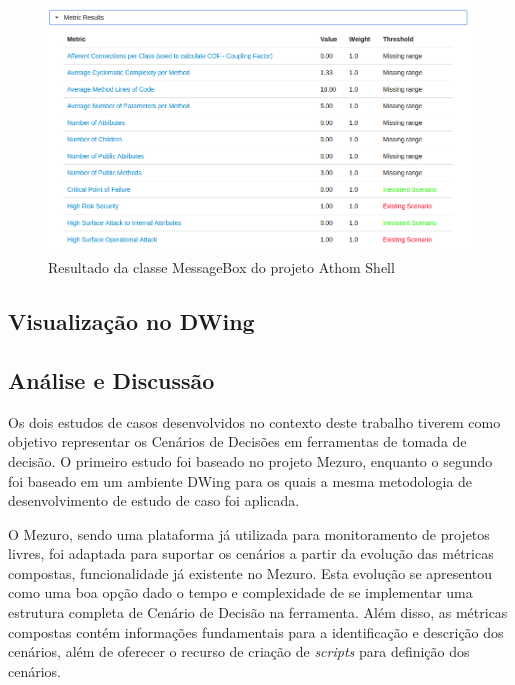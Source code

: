 \begin{figure}[H]
	\centering
	\includegraphics[scale=0.5]{figuras/message_box_class}
	\caption{Resultado da classe MessageBox do projeto Athom Shell}
	\label{message_box_class}
\end{figure}









\subsection{Visualização no DWing}
\label{vision-dw}

\subsection{Análise e Discussão}
\label{ana-disc}

Os dois estudos de casos desenvolvidos no contexto deste trabalho tiverem como objetivo representar os Cenários de Decisões em ferramentas de tomada de decisão. O primeiro estudo foi baseado no projeto Mezuro, enquanto o segundo foi baseado em um ambiente DWing para os quais a mesma metodologia de desenvolvimento de estudo de caso foi aplicada. 

O Mezuro, sendo uma plataforma já utilizada para monitoramento de projetos livres, foi adaptada para suportar os cenários a partir da evolução das métricas compostas, funcionalidade já existente no Mezuro. Esta evolução se apresentou como uma boa opção dado o tempo e complexidade de se implementar uma estrutura completa de Cenário de Decisão na ferramenta. Além disso, as métricas compostas contém informações fundamentais para a identificação e descrição dos cenários, além de oferecer o recurso de criação de \emph{scripts} para definição dos cenários.

